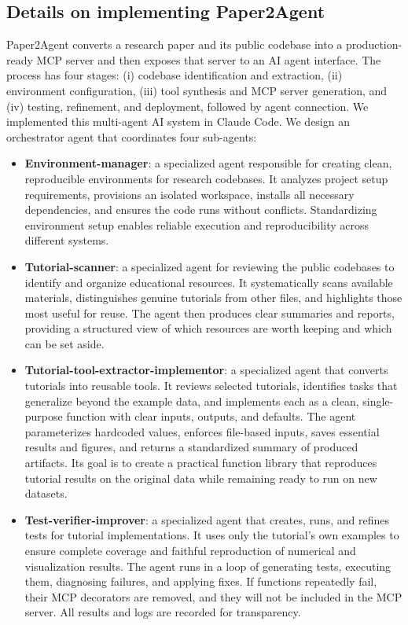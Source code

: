 \documentclass[11pt]{article}
\begin{document}
\subsection*{Details on implementing Paper2Agent}
Paper2Agent converts a research paper and its public codebase into a production-ready MCP server and then exposes that server to an AI agent interface. The process has four stages: (i) codebase identification and extraction, (ii) environment configuration, (iii) tool synthesis and MCP server generation, and (iv) testing, refinement, and deployment, followed by agent connection. We implemented this multi-agent AI system in Claude Code. We design an orchestrator agent that coordinates four sub-agents:
\begin{itemize}
    \item \textbf{Environment-manager}: a specialized agent responsible for creating clean, reproducible environments for research codebases. It analyzes project setup requirements, provisions an isolated workspace, installs all necessary dependencies, and ensures the code runs without conflicts. Standardizing environment setup enables reliable execution and reproducibility across different systems.
    \item \textbf{Tutorial-scanner}: a specialized agent for reviewing the public codebases to identify and organize educational resources. It systematically scans available materials, distinguishes genuine tutorials from other files, and highlights those most useful for reuse. The agent then produces clear summaries and reports, providing a structured view of which resources are worth keeping and which can be set aside.
    \item \textbf{Tutorial-tool-extractor-implementor}: a specialized agent that converts tutorials into reusable tools. It reviews selected tutorials, identifies tasks that generalize beyond the example data, and implements each as a clean, single-purpose function with clear inputs, outputs, and defaults. The agent parameterizes hardcoded values, enforces file-based inputs, saves essential results and figures, and returns a standardized summary of produced artifacts. Its goal is to create a practical function library that reproduces tutorial results on the original data while remaining ready to run on new datasets.
    \item \textbf{Test-verifier-improver}: a specialized agent that creates, runs, and refines tests for tutorial implementations. It uses only the tutorial’s own examples to ensure complete coverage and faithful reproduction of numerical and visualization results. The agent runs in a loop of generating tests, executing them, diagnosing failures, and applying fixes. If functions repeatedly fail, their MCP decorators are removed, and they will not be included in the MCP server. All results and logs are recorded for transparency.
\end{itemize}
\end{document}
